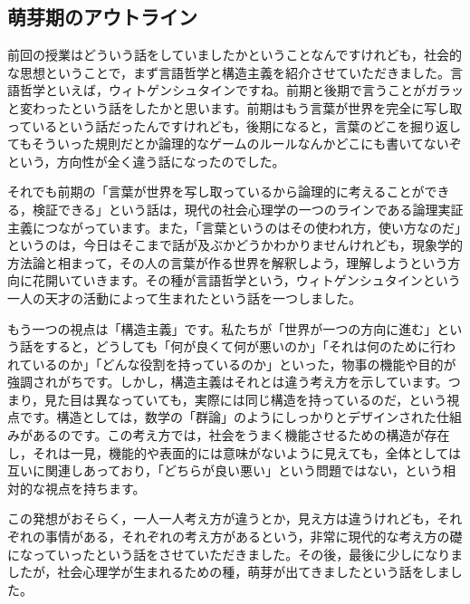 \documentclass{ltjsbook}
\begin{document}
\subsection{萌芽期のアウトライン}

前回の授業はどういう話をしていましたかということなんですけれども，社会的な思想ということで，まず言語哲学と構造主義を紹介させていただきました。言語哲学といえば，ウィトゲンシュタインですね。前期と後期で言うことがガラッと変わったという話をしたかと思います。前期はもう言葉が世界を完全に写し取っているという話だったんですけれども，後期になると，言葉のどこを掘り返してもそういった規則だとか論理的なゲームのルールなんかどこにも書いてないぞという，方向性が全く違う話になったのでした。

それでも前期の「言葉が世界を写し取っているから論理的に考えることができる，検証できる」という話は，現代の社会心理学の一つのラインである論理実証主義につながっています。また，「言葉というのはその使われ方，使い方なのだ」というのは，今日はそこまで話が及ぶかどうかわかりませんけれども，現象学的方法論と相まって，その人の言葉が作る世界を解釈しよう，理解しようという方向に花開いていきます。その種が言語哲学という，ウィトゲンシュタインという一人の天才の活動によって生まれたという話を一つしました。

もう一つの視点は「構造主義」です。私たちが「世界が一つの方向に進む」という話をすると，どうしても「何が良くて何が悪いのか」「それは何のために行われているのか」「どんな役割を持っているのか」といった，物事の機能や目的が強調されがちです。しかし，構造主義はそれとは違う考え方を示しています。つまり，見た目は異なっていても，実際には同じ構造を持っているのだ，という視点です。構造としては，数学の「群論」のようにしっかりとデザインされた仕組みがあるのです。この考え方では，社会をうまく機能させるための構造が存在し，それは一見，機能的や表面的には意味がないように見えても，全体としては互いに関連しあっており，「どちらが良い悪い」という問題ではない，という相対的な視点を持ちます。

この発想がおそらく，一人一人考え方が違うとか，見え方は違うけれども，それぞれの事情がある，それぞれの考え方があるという，非常に現代的な考え方の礎になっていったという話をさせていただきました。その後，最後に少しになりましたが，社会心理学が生まれるための種，萌芽が出てきましたという話をしました。
\end{document}
